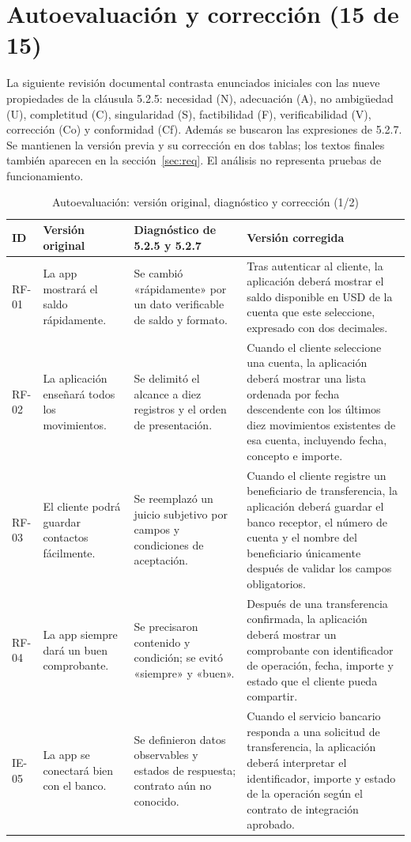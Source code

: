 \documentclass[conference,a4paper]{IEEEtran}
\begin{document}
\section{Autoevaluación y corrección (15 de 15)}
La siguiente revisión documental contrasta enunciados iniciales con las nueve propiedades de la cláusula 5.2.5: necesidad (N), adecuación (A), no ambigüedad (U), completitud (C), singularidad (S), factibilidad (F), verificabilidad (V), corrección (Co) y conformidad (Cf). Además se buscaron las expresiones de 5.2.7. Se mantienen la versión previa y su corrección en dos tablas; los textos finales también aparecen en la sección~\ref{sec:req}. El análisis no representa pruebas de funcionamiento.
\begin{table}[!t]
\centering\caption{Autoevaluación: versión original, diagnóstico y corrección (1/2)}
\fontsize{7.4}{8.6}\selectfont
\begin{tabularx}{\textwidth}{@{}p{0.70cm}p{3.45cm}p{3.45cm}Y@{}}
\toprule ID & Versión original & Diagnóstico de 5.2.5 y 5.2.7 & Versión corregida \\
\midrule
RF-01 & La app mostrará el saldo rápidamente. & Se cambió «rápidamente» por un dato verificable de saldo y formato. & Tras autenticar al cliente, la aplicación deberá mostrar el saldo disponible en USD de la cuenta que este seleccione, expresado con dos decimales. \\
RF-02 & La aplicación enseñará todos los movimientos. & Se delimitó el alcance a diez registros y el orden de presentación. & Cuando el cliente seleccione una cuenta, la aplicación deberá mostrar una lista ordenada por fecha descendente con los últimos diez movimientos existentes de esa cuenta, incluyendo fecha, concepto e importe. \\
RF-03 & El cliente podrá guardar contactos fácilmente. & Se reemplazó un juicio subjetivo por campos y condiciones de aceptación. & Cuando el cliente registre un beneficiario de transferencia, la aplicación deberá guardar el banco receptor, el número de cuenta y el nombre del beneficiario únicamente después de validar los campos obligatorios. \\
RF-04 & La app siempre dará un buen comprobante. & Se precisaron contenido y condición; se evitó «siempre» y «buen». & Después de una transferencia confirmada, la aplicación deberá mostrar un comprobante con identificador de operación, fecha, importe y estado que el cliente pueda compartir. \\
IE-05 & La app se conectará bien con el banco. & Se definieron datos observables y estados de respuesta; contrato aún no conocido. & Cuando el servicio bancario responda a una solicitud de transferencia, la aplicación deberá interpretar el identificador, importe y estado de la operación según el contrato de integración aprobado. \\

\end{tabularx}
\end{table}
\end{document}
